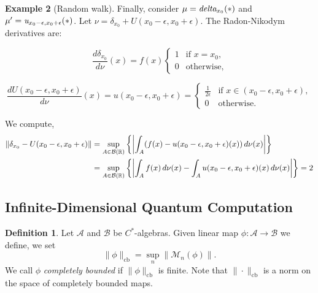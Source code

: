\documentclass[10pt,a4paper]{amsart}
\theoremstyle{definition}
\newtheorem{definition}{Definition}[section]
\theoremstyle{definition}
\newtheorem{example}[definition]{Example}
\theoremstyle{definition}
\theoremstyle{definition}
\theoremstyle{definition}
\theoremstyle{definition}
\begin{document}
\begin{example}[Random walk]
\begin{comment}
\end{comment}

Finally, consider $\mu =\emph{delta}_{x_0}(*) $  and $\mu' =\emph{u}_{x_0 - \epsilon,x_0 + \epsilon}(*) $. Let \(\nu = \delta_{x_0} + U(x_0 - \epsilon, x_0 + \epsilon) \). The Radon-Nikodym derivatives are:

\[
\frac{d\delta_{x_0}}{d\nu}(x) = f (x)
\begin{cases} 
1 & \text{if } x = x_0, \\
0 & \text{otherwise},
\end{cases}
\]

\[
\frac{dU(x_0 - \epsilon, x_0 + \epsilon)}{d\nu}(x) = u(x_0 - \epsilon, x_0 + \epsilon) = 
\begin{cases} 
\frac{1}{2\epsilon} & \text{if } x \in (x_0 - \epsilon, x_0 + \epsilon), \\
0 & \text{otherwise}.
\end{cases}
\]

We compute,
\begin{align*}
  \left\lVert \delta_{x_0}-U(x_0 - \epsilon, x_0 + \epsilon) \right\rVert &= \sup_{A \in \mathcal{B}(\mathbb{R})} \left\{ \left\vert \int_A (f(x)- u(x_0 - \epsilon, x_0 + \epsilon) (x))\, d\nu(x) \right\vert \right\} \\
  &= \sup_{A \in \mathcal{B}(\mathbb{R})} \left\{ \left\vert \int_A f(x)\, d\nu(x) -  \int_A   u(x_0 - \epsilon, x_0 + \epsilon) (x) \, d\nu(x) \right\vert \right\} = 2
\end{align*}
    


\subsection{Infinite-Dimensional Quantum Computation}




  


\begin{definition}
Let $\mathcal{A}$ and $\mathcal{B}$ be $C^*$-algebras. Given  linear map $\phi: \mathcal{A} \to \mathcal{B}$ we define, we set
\[
\|\phi\|_{\text{cb}} = \sup_n \|\mathcal{M}_n(\phi)\|.
\]
We call $\phi$ \emph{completely bounded} if $\|\phi\|_{\text{cb}} $ is finite.
Note that $\|\cdot\|_{\text{cb}}$ is a norm on the space of completely bounded maps. 


\end{definition}
\end{example}
\end{document}
